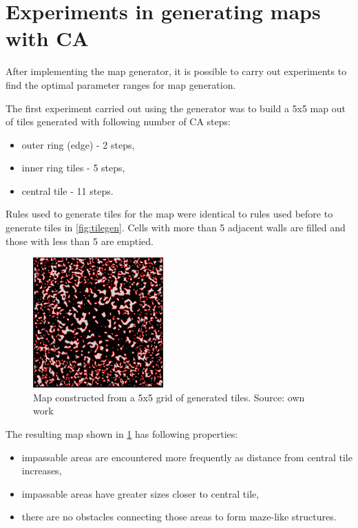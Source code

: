 \documentclass[12pt]{report}
\begin{document}
 
\section{Experiments in generating maps with CA}

After implementing the map generator, it is possible to carry out experiments to find the optimal parameter ranges for map generation.

The first experiment carried out using the generator was to build a 5x5 map out of tiles generated with following number of CA steps:

\begin{itemize}
	\item outer ring (edge) - 2 steps,
	\item inner ring tiles - 5 steps,
	\item central tile - 11 steps.
\end{itemize}

Rules used to generate tiles for the map were identical to rules used before to generate tiles in \cref*{fig:tilegen}. Cells with more than 5 adjacent walls are filled and those with less than 5 are emptied.

 \begin{figure}[h]
	\centering
	\includegraphics[height=5cm]{images/ex1}
	\caption{Map constructed from a 5x5 grid of generated tiles. Source: own work}
	\label{fig:ex1}
\end{figure}

The resulting map shown in \cref{fig:ex1} has following properties:

\begin{itemize}
	\item impassable areas are encountered more frequently as distance from central tile increases,
	\item impassable areas have greater sizes closer to central tile,
	\item there are no obstacles connecting those areas to form maze-like structures.
\end{itemize} 
 
\end{document}
